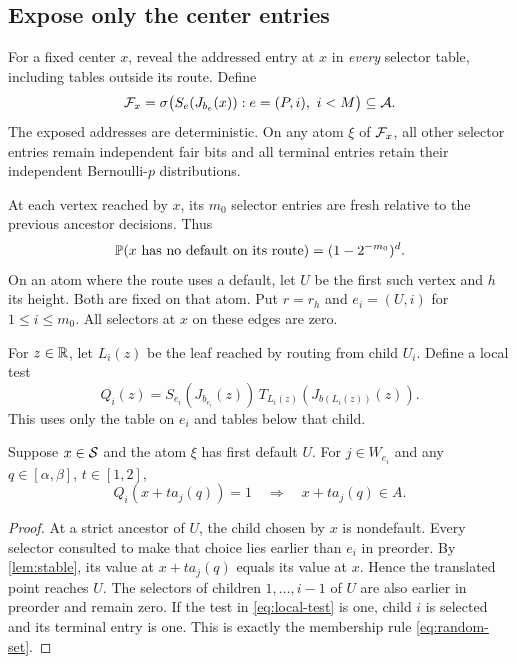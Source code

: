 \subsection{Expose only the center entries}

For a fixed center $x$, reveal the addressed entry at $x$ in \emph{every}
selector table, including tables outside its route. Define
\begin{equation}\label{eq:center-field}
 \mathcal F_x=\sigma\bigl(S_e(J_{b_e}(x)): e=(P,i),\ i<M\bigr)
 \subseteq\mathcal A.
\end{equation}
The exposed addresses are deterministic. On any atom $\xi$ of $\mathcal F_x$,
all other selector entries remain independent fair bits and all terminal
entries retain their independent Bernoulli-$p$ distributions.

At each vertex reached by $x$, its $m_0$ selector entries are fresh
relative to the previous ancestor decisions. Thus
\begin{equation}\label{eq:no-default}
 \mathbb P(\text{$x$ has no default on its route})=(1-2^{-m_0})^d.
\end{equation}
On an atom where the route uses a default, let $U$ be the first such
vertex and $h$ its height. Both are fixed on that atom. Put $r=r_h$
and $e_i=(U,i)$ for $1\le i\le m_0$. All selectors at $x$ on these
edges are zero.

For $z\in\mathbb R$, let $L_i(z)$ be the leaf reached by routing from
child $U_i$. Define a local test
\begin{equation}\label{eq:local-test}
 Q_i(z)=S_{e_i}(J_{b_{e_i}}(z))\,
 T_{L_i(z)}(J_{b(L_i(z))}(z)).
\end{equation}
This uses only the table on $e_i$ and tables below that child.

\begin{lemma}\label{lem:local-hit}
Suppose $x\in\mathcal S$ and the atom $\xi$ has first default $U$.
For $j\in W_{e_i}$ and any $q\in[\alpha,\beta]$, $t\in[1,2]$,
\begin{equation}\label{eq:local-hit}
 Q_i(x+ta_j(q))=1\quad\Longrightarrow\quad x+ta_j(q)\in A.
\end{equation}
\end{lemma}

\begin{proof}
At a strict ancestor of $U$, the child chosen by $x$ is nondefault.
Every selector consulted to make that choice lies earlier than $e_i$
in preorder. By \cref{lem:stable}, its value at $x+ta_j(q)$ equals
its value at $x$. Hence the translated point reaches $U$.
The selectors of children $1,\ldots,i-1$ of $U$ are also earlier
in preorder and remain zero. If the test in \eqref{eq:local-test}
is one, child $i$ is selected and its terminal entry is one. This is
exactly the membership rule \eqref{eq:random-set}.
\end{proof}

